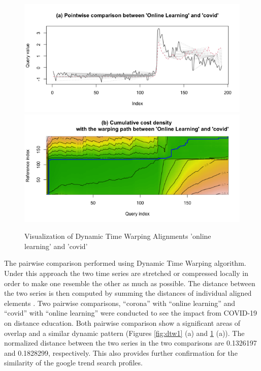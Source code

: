 \documentclass[11pt,a4paper,]{article}
\begin{document}
\begin{figure}[h]

{\centering \includegraphics[width=1\textwidth]{figure/dtw2-1} \includegraphics[width=1\textwidth]{figure/dtw2-2} 

}

\caption{Visualization of Dynamic Time Warping Alignments  'online learning' and 'covid'}\label{fig:dtw2}
\end{figure}

The pairwise comparison performed using Dynamic Time Warping algorithm. Under this approach the two time series are stretched or compressed locally in order to make one resemble the other as much as possible. The distance between the two series is then computed by summing the distances of individual aligned elements \autocite{giorgino2009computing}. Two pairwise comparisons, ``corona'' with ``online learning'' and ``covid'' with ``online learning'' were conducted to see the impact from COVID-19 on distance education. Both pairwise comparison show a significant areas of overlap and a similar dynamic pattern (Figures \ref{fig:dtw1} (a) and \ref{fig:dtw2} (a)). The normalized distance between the two series in the two comparisons are 0.1326197 and 0.1828299, respectively. This also provides further confirmation for the similarity of the google trend search profiles.
\end{document}
